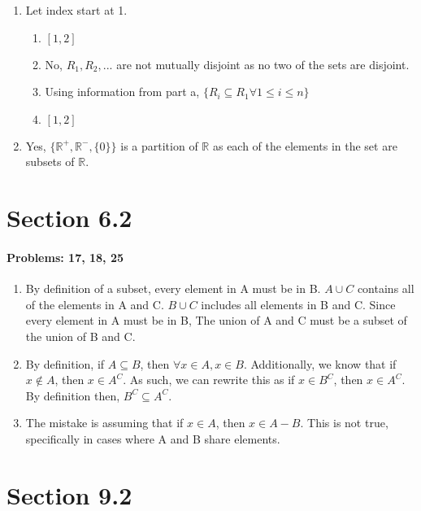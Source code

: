 \documentclass{article}
\makeatletter
\newcommand\setItemnumber[1]{\setcounter{enum\romannumeral\@enumdepth}{\numexpr#1-1\relax}}
\makeatother
\begin{document}
\begin{enumerate}
\begin{enumerate}
    \end{enumerate}
    \setItemnumber{25}
    \item Let index start at 1.
    \begin{enumerate}
        \item $[1,2]$
        \setItemnumber{3}
        \item No, $R_1,R_2,...$ are not mutually disjoint as no two of the sets are disjoint.
        \item  Using information from part a, $\{R_i\subseteq R_1 \forall 1\leq i\leq n\}$
        \setItemnumber{6}
        \item $[1,2]$
    \end{enumerate}
    \setItemnumber{29}
    \item Yes, $\{\mathbb{R}^+,\mathbb{R}^-,\{0\}\}$ is a partition of $\mathbb{R}$ as each of the elements in the set are subsets of $\mathbb{R}$.
\end{enumerate}
\section{Section 6.2}
\paragraph{Problems: 17, 18, 25}
\begin{enumerate}
    \setItemnumber{17}
    \item By definition of a subset, every element in A must be in B. $A\cup C$ contains all of the elements in A and C. $B\cup C$ includes all elements in B and C. Since every element in A must be in B, The union of A and C must be a subset of the union of B and C.
    \item By definition, if $A\subseteq B$, then $\forall x\in A, x\in B$. Additionally, we know that if $x\not\in A$, then $x\in A^C$. As such, we can rewrite this as if $x\in B^C$, then $x\in A^C$. By definition then, $B^C\subseteq A^C$.
    \setItemnumber{25}
    \item The mistake is assuming that if $x\in A$, then $x\in A-B$. This is not true, specifically in cases where A and B share elements.
\end{enumerate}

\section{Section 9.2}
\end{document}
